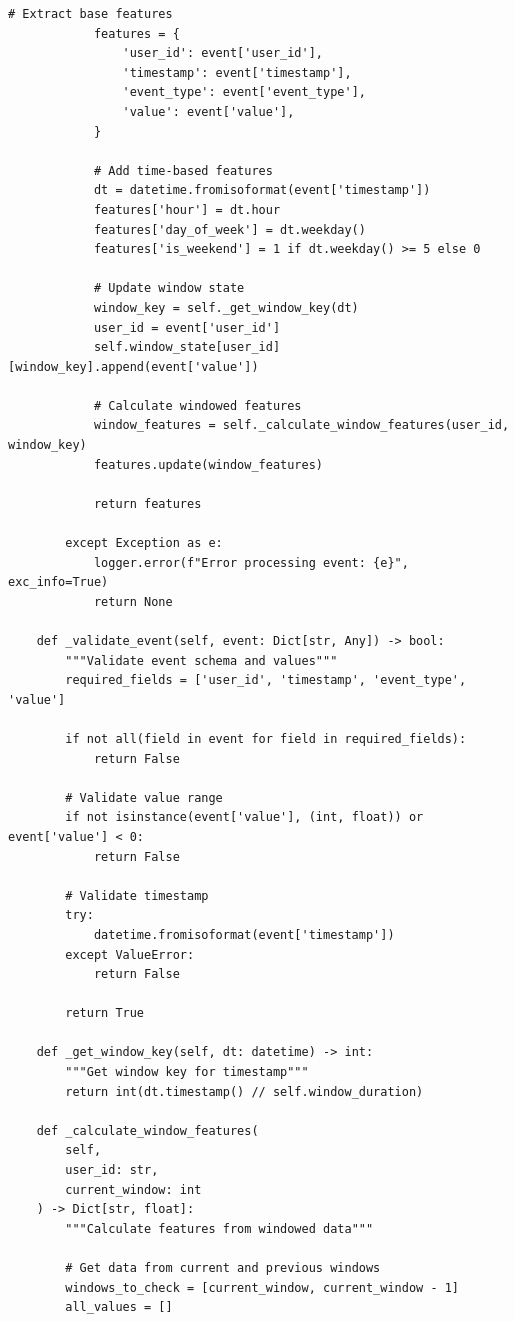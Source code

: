 \begin{lstlisting}[style=python, caption=Streaming Pipeline with Kafka]
            # Extract base features
            features = {
                'user_id': event['user_id'],
                'timestamp': event['timestamp'],
                'event_type': event['event_type'],
                'value': event['value'],
            }

            # Add time-based features
            dt = datetime.fromisoformat(event['timestamp'])
            features['hour'] = dt.hour
            features['day_of_week'] = dt.weekday()
            features['is_weekend'] = 1 if dt.weekday() >= 5 else 0

            # Update window state
            window_key = self._get_window_key(dt)
            user_id = event['user_id']
            self.window_state[user_id][window_key].append(event['value'])

            # Calculate windowed features
            window_features = self._calculate_window_features(user_id, window_key)
            features.update(window_features)

            return features

        except Exception as e:
            logger.error(f"Error processing event: {e}", exc_info=True)
            return None

    def _validate_event(self, event: Dict[str, Any]) -> bool:
        """Validate event schema and values"""
        required_fields = ['user_id', 'timestamp', 'event_type', 'value']

        if not all(field in event for field in required_fields):
            return False

        # Validate value range
        if not isinstance(event['value'], (int, float)) or event['value'] < 0:
            return False

        # Validate timestamp
        try:
            datetime.fromisoformat(event['timestamp'])
        except ValueError:
            return False

        return True

    def _get_window_key(self, dt: datetime) -> int:
        """Get window key for timestamp"""
        return int(dt.timestamp() // self.window_duration)

    def _calculate_window_features(
        self,
        user_id: str,
        current_window: int
    ) -> Dict[str, float]:
        """Calculate features from windowed data"""

        # Get data from current and previous windows
        windows_to_check = [current_window, current_window - 1]
        all_values = []


\end{lstlisting}
